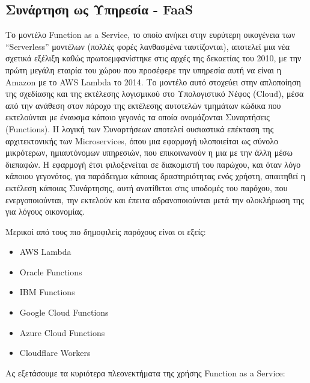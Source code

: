 \documentclass{article}
\begin{document}
\subsection{Συνάρτηση ως Υπηρεσία - FaaS}
Το μοντέλο Function as a Service, το οποίο ανήκει στην ευρύτερη οικογένεια των “Serverless” μοντέλων (πολλές φορές λανθασμένα ταυτίζονται), αποτελεί μια νέα σχετικά εξέλιξη καθώς πρωτοεμφανίστηκε στις αρχές της δεκαετίας του 2010, με την πρώτη μεγάλη εταιρία του χώρου που προσέφερε την υπηρεσία αυτή να είναι η Amazon με το AWS Lambda το 2014. Το μοντέλο αυτό στοχεύει στην απλοποίηση της σχεδίασης και της εκτέλεσης λογισμικού στο Υπολογιστικό Νέφος (Cloud), μέσα από την ανάθεση στον πάροχο της εκτέλεσης αυτοτελών τμημάτων κώδικα που εκτελούνται με έναυσμα κάποιο γεγονός τα οποία ονομάζονται Συναρτήσεις (Functions). Η λογική των Συναρτήσεων αποτελεί ουσιαστικά επέκταση της αρχιτεκτονικής των Microservices, όπου μια εφαρμογή υλοποιείται ως σύνολο μικρότερων, ημιαυτόνομων υπηρεσιών, που επικοινωνούν η μια με την άλλη μέσω διεπαφών. Η εφαρμογή έτσι φιλοξενείται σε διακομιστή του παρώχου, και όταν λόγο κάποιου γεγονότος, για παράδειγμα κάποιας δραστηριότητας ενός χρήστη, απαιτηθεί η εκτέλεση κάποιας Συνάρτησης, αυτή ανατίθεται στις υποδομές του παρόχου, που ενεργοποιούνται, την εκτελούν και έπειτα αδρανοποιούνται μετά την ολοκλήρωση της για λόγους οικονομίας. 

Μερικοί από τους πιο δημοφιλείς παρόχους είναι οι εξείς:
\begin{itemize}
\item AWS Lambda
\item Oracle Functions
\item IBM Functions
\item Google Cloud Functions
\item Azure Cloud Functions
\item Cloudflare Workers
\end{itemize}
Ας εξετάσουμε τα κυριότερα πλεονεκτήματα της χρήσης Function as a Service:
\end{document}

